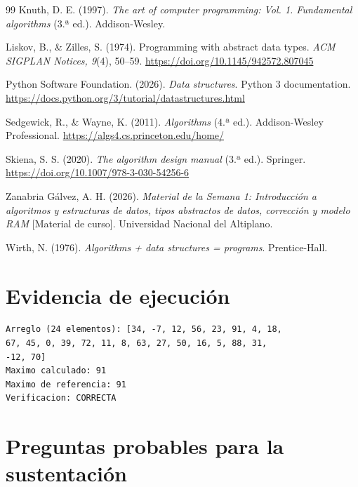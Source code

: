 \documentclass[12pt,letterpaper]{article}
\begin{document}
\begin{thebibliography}{99}
Knuth, D. E. (1997). \textit{The art of computer programming: Vol. 1. Fundamental algorithms} (3.ª ed.). Addison-Wesley.

Liskov, B., \& Zilles, S. (1974). Programming with abstract data types. \textit{ACM SIGPLAN Notices, 9}(4), 50--59. \url{https://doi.org/10.1145/942572.807045}

Python Software Foundation. (2026). \textit{Data structures}. Python 3 documentation. \url{https://docs.python.org/3/tutorial/datastructures.html}

Sedgewick, R., \& Wayne, K. (2011). \textit{Algorithms} (4.ª ed.). Addison-Wesley Professional. \url{https://algs4.cs.princeton.edu/home/}

Skiena, S. S. (2020). \textit{The algorithm design manual} (3.ª ed.). Springer. \url{https://doi.org/10.1007/978-3-030-54256-6}

Zanabria Gálvez, A. H. (2026). \textit{Material de la Semana 1: Introducción a algoritmos y estructuras de datos, tipos abstractos de datos, corrección y modelo RAM} [Material de curso]. Universidad Nacional del Altiplano.

Wirth, N. (1976). \textit{Algorithms + data structures = programs}. Prentice-Hall.

\end{thebibliography}

\clearpage
\appendix
\section{Evidencia de ejecución}

\begin{lstlisting}[style=codigo,caption={Salida común verificada en Python y C++}]
Arreglo (24 elementos): [34, -7, 12, 56, 23, 91, 4, 18,
67, 45, 0, 39, 72, 11, 8, 63, 27, 50, 16, 5, 88, 31,
-12, 70]
Maximo calculado: 91
Maximo de referencia: 91
Verificacion: CORRECTA
\end{lstlisting}

\section{Preguntas probables para la sustentación}
\end{document}
